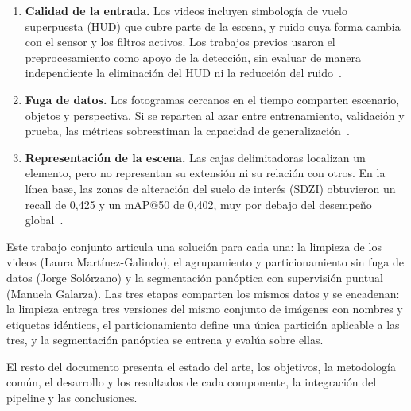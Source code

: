 \begin{enumerate}
    \item \textbf{Calidad de la entrada.} Los videos incluyen simbología de vuelo superpuesta (HUD) que cubre parte de la escena, y ruido cuya forma cambia con el sensor y los filtros activos. Los trabajos previos usaron el preprocesamiento como apoyo de la detección, sin evaluar de manera independiente la eliminación del HUD ni la reducción del ruido~\cite{acosta2025eyes,delahoz2025enhancing}.
    \item \textbf{Fuga de datos.} Los fotogramas cercanos en el tiempo comparten escenario, objetos y perspectiva. Si se reparten al azar entre entrenamiento, validación y prueba, las métricas sobreestiman la capacidad de generalización~\cite{figueiredo2024leakage}.
    \item \textbf{Representación de la escena.} Las cajas delimitadoras localizan un elemento, pero no representan su extensión ni su relación con otros. En la línea base, las zonas de alteración del suelo de interés (SDZI) obtuvieron un recall de 0,425 y un mAP@50 de 0,402, muy por debajo del desempeño global~\cite{acosta2025eyes}.
\end{enumerate}

Este trabajo conjunto articula una solución para cada una: la limpieza de los videos (Laura Martínez-Galindo), el agrupamiento y particionamiento sin fuga de datos (Jorge Solórzano) y la segmentación panóptica con supervisión puntual (Manuela Galarza). Las tres etapas comparten los mismos datos y se encadenan: la limpieza entrega tres versiones del mismo conjunto de imágenes con nombres y etiquetas idénticos, el particionamiento define una única partición aplicable a las tres, y la segmentación panóptica se entrena y evalúa sobre ellas.

El resto del documento presenta el estado del arte, los objetivos, la metodología común, el desarrollo y los resultados de cada componente, la integración del pipeline y las conclusiones.
